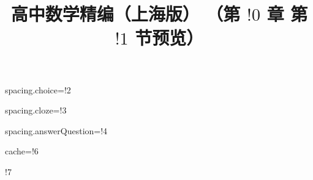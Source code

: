 \documentclass{article}
\title{高中数学精编（上海版） （第 $!0$ 章 第 $!1$ 节预览）}
\begin{document}
\maketitle

spacing.choice=!2

spacing.cloze=!3

spacing.answerQuestion=!4

cache=!6

!7
\end{document}
